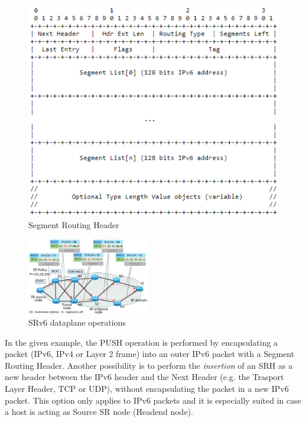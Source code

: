 \begin{figure}
    \centering
    \includegraphics[width=0.8\columnwidth]{fig/sr-header.png}
    \caption{Segment Routing Header}
    \label{fig:sr-header}
\end{figure}

\begin{figure}
    \centering
    \includegraphics[width=0.48\textwidth]{fig/srv6-example.pdf}
    \caption{SRv6 dataplane operations}
    \label{fig:srv6-dataplane}
    \vspace{-3ex}
\end{figure}

In the given example, the PUSH operation is performed by encapsulating a packet (IPv6, IPv4 or Layer 2 frame) into an outer IPv6 packet with a Segment Routing Header. Another possibility is to perform the \textit{insertion} of an SRH as a new header between the IPv6 header and the Next Header (e.g. the Trasport Layer Header, TCP or UDP), without encapsulating the packet in a new IPv6 packet. This option only applies to IPv6 packets and it is especially suited in case a host is acting as Source SR node (Headend node). 

